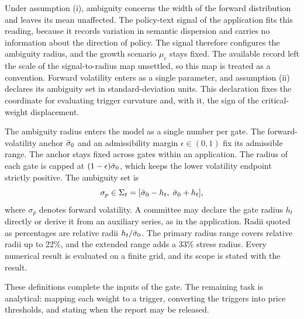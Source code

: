 Under assumption (i), ambiguity concerns the width of the forward distribution and leaves its mean unaffected. The policy-text signal of the application fits this reading, because it records variation in semantic dispersion and carries no information about the direction of policy. The signal therefore configures the ambiguity radius, and the growth scenario $\mu_c$ stays fixed. The available record left the scale of the signal-to-radius map unsettled, so this map is treated as a convention. Forward volatility enters as a single parameter, and assumption (ii) declares its ambiguity set in standard-deviation units. This declaration fixes the coordinate for evaluating trigger curvature and, with it, the sign of the critical-weight displacement.

The ambiguity radius enters the model as a single number per gate. The forward-volatility anchor $\bar{\sigma}_0$ and an admissibility margin $\epsilon\in(0,1)$ fix its admissible range. The anchor stays fixed across gates within an application. The radius of each gate is capped at $(1-\epsilon)\bar{\sigma}_0$, which keeps the lower volatility endpoint strictly positive. The ambiguity set is
\begin{equation}
\sigma_p\in\Sigma_t=[\bar{\sigma}_0-h_t,\;\bar{\sigma}_0+h_t],
\label{eq:ambset}
\end{equation}
where $\sigma_p$ denotes forward volatility. A committee may declare the gate radius $h_t$ directly or derive it from an auxiliary series, as in the application. Radii quoted as percentages are relative radii $h_t/\bar{\sigma}_0$. The primary radius range covers relative radii up to 22\%, and the extended range adds a 33\% stress radius. Every numerical result is evaluated on a finite grid, and its scope is stated with the result.

These definitions complete the inputs of the gate. The remaining task is analytical: mapping each weight to a trigger, converting the triggers into price thresholds, and stating when the report may be released.

